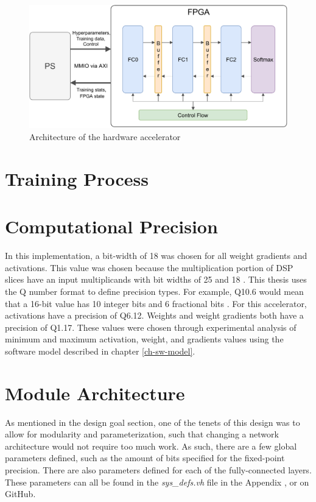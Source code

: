 \begin{figure}
	\centering 
	\includegraphics[width=\textwidth]{figures/overall_arch}
	\caption{Architecture of the hardware accelerator}\label{overall-arch}
\end{figure}

\section{Training Process}



\section{Computational Precision}
In this implementation, a bit-width of 18 was chosen for all weight gradients and activations. This value was chosen because the multiplication portion of DSP slices have an input multiplicands with bit widths of 25 and 18 . This thesis uses the Q number format to define precision types. For example, Q10.6 would mean that a 16-bit value has 10 integer bits and 6 fractional bits \cite{q-format}. For this accelerator, activations have a precision of Q6.12. Weights and weight gradients both have a precision of Q1.17. These values were chosen through experimental analysis of minimum and maximum activation, weight, and gradients values using the software model described in chapter \ref{ch-sw-model}.

\section{Module Architecture}
As mentioned in the design goal section, one of the tenets of this design was to allow for modularity and parameterization, such that changing a network architecture would not require too much work. As such, there are a few global parameters defined, such as the amount of bits specified for the fixed-point precision. There are also parameters defined for each of the fully-connected layers. These parameters can all be found in the \textit{sys\_defs.vh} file in the Appendix , or on GitHub. 

